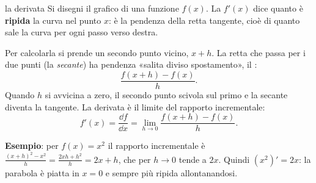 \begin{richiamo}{la derivata}
Si disegni il grafico di una funzione $f(x)$. La  $f'(x)$ dice quanto è \textbf{ripida} la curva nel
punto $x$: è la pendenza della retta tangente, cioè di quanto sale la curva per ogni passo verso destra.

Per calcolarla si prende un secondo punto vicino, $x + h$. La retta che passa per i due punti (la \emph{secante}) ha
pendenza «salita diviso spostamento», il :
\[ \frac{f(x + h) - f(x)}{h} . \]
Quando $h$ si avvicina a zero, il secondo punto scivola sul primo e la secante diventa la tangente. La derivata è il
limite del rapporto incrementale:
\[ f'(x) = \frac{\dd f}{\dd x} = \lim_{h \to 0} \frac{f(x + h) - f(x)}{h} . \]
\begin{center}
\end{center}
\textbf{Esempio}: per $f(x) = x^2$ il rapporto incrementale è
$\frac{(x+h)^2 - x^2}{h} = \frac{2xh + h^2}{h} = 2x + h$, che per $h \to 0$ tende a $2x$. Quindi $(x^2)' = 2x$: la
parabola è piatta in $x = 0$ e sempre più ripida allontanandosi.


\end{richiamo}
